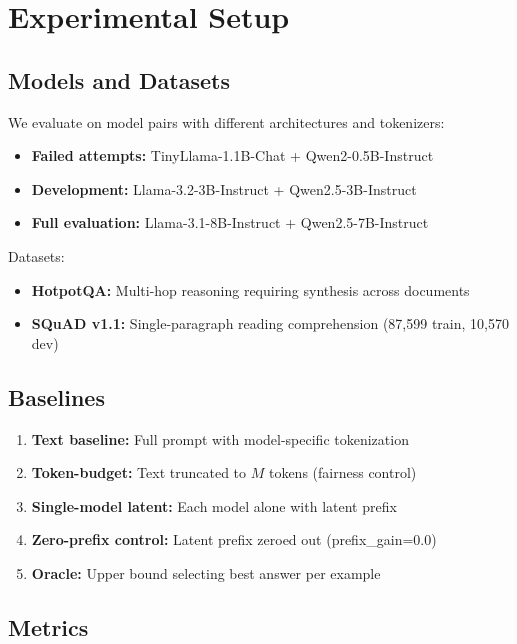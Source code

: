 \documentclass{article}
\begin{document}
\section{Experimental Setup}

\subsection{Models and Datasets}

We evaluate on model pairs with different architectures and tokenizers:
\begin{itemize}
\item \textbf{Failed attempts:} TinyLlama-1.1B-Chat + Qwen2-0.5B-Instruct
\item \textbf{Development:} Llama-3.2-3B-Instruct + Qwen2.5-3B-Instruct  
\item \textbf{Full evaluation:} Llama-3.1-8B-Instruct + Qwen2.5-7B-Instruct
\end{itemize}

Datasets:
\begin{itemize}
\item \textbf{HotpotQA:} Multi-hop reasoning requiring synthesis across documents
\item \textbf{SQuAD v1.1:} Single-paragraph reading comprehension (87,599 train, 10,570 dev)
\end{itemize}

\subsection{Baselines}

\begin{enumerate}
\item \textbf{Text baseline:} Full prompt with model-specific tokenization
\item \textbf{Token-budget:} Text truncated to $M$ tokens (fairness control)  
\item \textbf{Single-model latent:} Each model alone with latent prefix
\item \textbf{Zero-prefix control:} Latent prefix zeroed out (prefix\_gain=0.0)
\item \textbf{Oracle:} Upper bound selecting best answer per example
\end{enumerate}

\subsection{Metrics}
\end{document}

